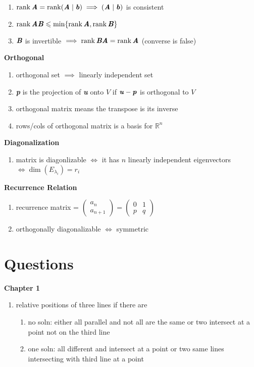 \documentclass[landscape, a4paper]{article}
\let\leq\leqslant
\newcommand{\R}{\mathbb{R}}
\newcommand{\V}[1]{\textbf{\textit{#1}}}
\newcommand{\rank}{\operatorname{rank}}
\newcommand{\customsection}[1]{
    \vspace*{-10pt}
    \section*{#1}
}
\newcommand{\heading}[1]{
    \noindent\textbf{#1}
}
\begin{document}
\begin{multicols*}{4}
\begin{enumerate}
        \item $\rank \V{A} = \rank (\V{A} \mid \V{b}) \implies (\V{A} \mid \V{b})$ is consistent
        \item $\rank \V{AB} \leq \min\{\rank \V{A}, \rank \V{B}\}$
        \item $\V{B}$ is invertible $\implies \rank \V{BA}=\rank \V{A}$ (converse is false)
    \end{enumerate}
    \heading{Orthogonal}
    \begin{enumerate}
        \item orthogonal set $\implies$ linearly independent set
        \item \V{p} is the projection of \V{u} onto $V$ if $\V{u} - \V{p}$ is orthogonal to $V$
        \item orthogonal matrix means the transpose is its inverse
        \item rows/cols of orthogonal matrix is a basis for $\R^n$
    \end{enumerate}
    \heading{Diagonalization}
    \begin{enumerate}
        \item matrix is diagonlizable $\iff$ it has $n$ linearly independent eigenvectors $\iff \dim(E_{\lambda_i})=r_i$
    \end{enumerate}
    \heading{Recurrence Relation}
    \begin{enumerate}
        \item recurrence matrix = $\begin{pmatrix}a_n\\a_{n+1}\end{pmatrix}=\begin{pmatrix}0&1\\p & q\end{pmatrix}$
        \item orthogonally diagonalizable $\iff$ symmetric
    \end{enumerate}
    \customsection{Questions}
    \heading{Chapter 1}
    \begin{enumerate}
        \item relative positions of three lines if there are
              \begin{enumerate}
                  \item no soln: either all parallel and not all are the same or two intersect at a point not on the third line
                  \item one soln: all different and intersect at a point or two same lines intersecting with third line at a point

\end{enumerate}
\end{enumerate}
\end{multicols*}
\end{document}
